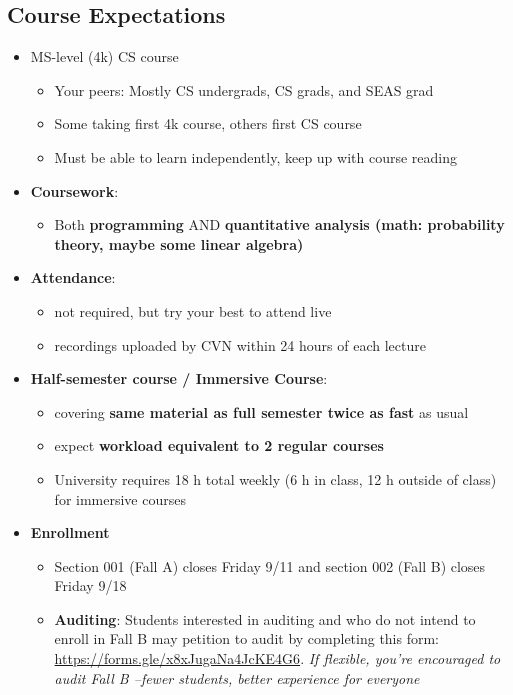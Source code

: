 \subsection*{Course Expectations}
\begin{itemize}
\item MS-level (4k) CS course
	\begin{itemize}
	\item
		Your peers: Mostly CS undergrads, CS grads, and SEAS grad
	\item
		Some taking first 4k course, others first CS course
	\item
		Must be able to learn independently, keep up with course reading
	\end{itemize}

\item \textbf{Coursework}:
	\begin{itemize}
	\item
		Both \textbf{programming} AND \textbf{quantitative analysis (math: probability theory, maybe some linear algebra)}
	\end{itemize}

\item \textbf{Attendance}:
	\begin{itemize}
		\item not required, but try your best to attend live
		\item recordings uploaded by CVN within 24 hours of each lecture
	\end{itemize}
\item \textbf{Half-semester course / Immersive Course}:
	\begin{itemize}
	\item
		covering \textbf{same material as full semester twice as fast} as usual
	\item
		expect \textbf{workload equivalent to 2 regular courses}

	\item
		University requires 18 h total weekly (6 h in class, 12 h outside of class) for immersive courses
	\end{itemize}

\item \textbf{Enrollment}
	\begin{itemize}
	\item
		Section 001 (Fall A) closes Friday 9/11 and section 002 (Fall B) closes Friday 9/18
	\item \textbf{Auditing}: Students interested in auditing and who do not intend to enroll in Fall B may petition to audit by completing this form: \url{https://forms.gle/x8xJugaNa4JcKE4G6}. \emph{If flexible, you're encouraged to audit Fall B --fewer students, better experience for everyone}
	\end{itemize}
\end{itemize}

